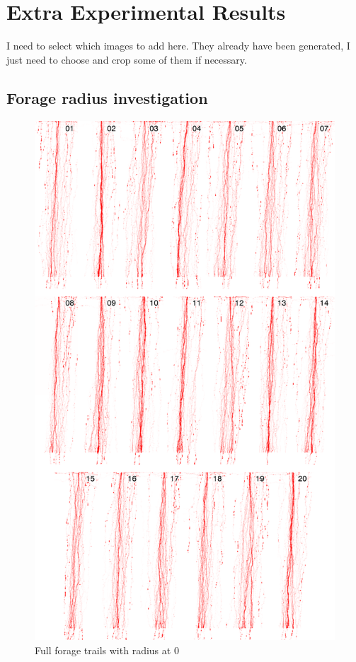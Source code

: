 \chapter{Extra Experimental Results}

I need to select which images to add here. They already have been generated, I just need to choose and crop some of them if necessary.

\section{Forage radius investigation}
\label{ap:exp-2}

\begin{figure}[H]
  \centering
  \includegraphics[width=0.8\linewidth]{gfx/radius-0-final.png}
  \caption{Full forage trails with radius at 0}
  \label{fig:radius-0-final}
\end{figure}

